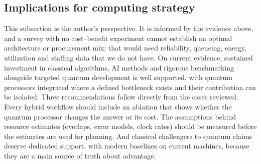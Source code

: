 \subsection{Implications for computing strategy}
\label{sec:strategy}
This subsection is the author's perspective. It is informed by the evidence above, and a survey with no cost--benefit experiment cannot establish an optimal architecture or procurement mix; that would need reliability, queueing, energy, utilization and staffing data that we do not have. On current evidence, sustained investment in classical algorithms, AI methods and rigorous benchmarking alongside targeted quantum development is well supported, with quantum processors integrated where a defined bottleneck exists and their contribution can be isolated. Three recommendations follow directly from the cases reviewed. Every hybrid workflow should include an ablation that shows whether the quantum processor changes the answer or its cost. The assumptions behind resource estimates (overlaps, error models, clock rates) should be measured before the estimates are used for planning. And classical challengers to quantum claims deserve dedicated support, with modern baselines on current machines, because they are a main source of truth about advantage.
